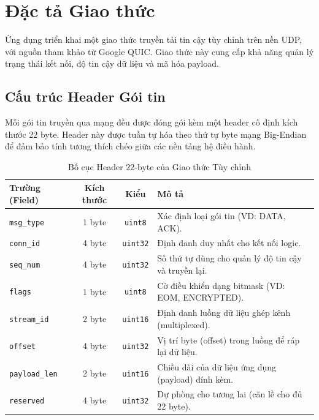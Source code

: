 \section{Đặc tả Giao thức}

Ứng dụng triển khai một giao thức truyền tải tin cậy tùy chỉnh trên nền UDP, với nguồn tham khảo từ Google QUIC. Giao thức này cung cấp khả năng quản lý trạng thái kết nối, độ tin cậy dữ liệu và mã hóa payload.

\subsection{Cấu trúc Header Gói tin}
Mỗi gói tin truyền qua mạng đều được đóng gói kèm một header cố định kích thước 22 byte. Header này được tuần tự hóa theo thứ tự byte mạng Big-Endian để đảm bảo tính tương thích chéo giữa các nền tảng hệ điều hành.

\begin{table}[htbp]
\centering
\renewcommand{\arraystretch}{1.3}
\begin{tabular}{|l|c|c|p{}|}
\hline
\textbf{Trường (Field)} & \textbf{Kích thước} & \textbf{Kiểu} & \textbf{Mô tả} \\ \hline
\texttt{msg\_type} & 1 byte & \texttt{uint8} & Xác định loại gói tin (VD: DATA, ACK). \\ \hline
\texttt{conn\_id} & 4 byte & \texttt{uint32} & Định danh duy nhất cho kết nối logic. \\ \hline
\texttt{seq\_num} & 4 byte & \texttt{uint32} & Số thứ tự dùng cho quản lý độ tin cậy và truyền lại. \\ \hline
\texttt{flags} & 1 byte & \texttt{uint8} & Cờ điều khiển dạng bitmask (VD: EOM, ENCRYPTED). \\ \hline
\texttt{stream\_id} & 2 byte & \texttt{uint16} & Định danh luồng dữ liệu ghép kênh (multiplexed). \\ \hline
\texttt{offset} & 4 byte & \texttt{uint32} & Vị trí byte (offset) trong luồng để ráp lại dữ liệu. \\ \hline
\texttt{payload\_len} & 2 byte & \texttt{uint16} & Chiều dài của dữ liệu ứng dụng (payload) đính kèm. \\ \hline
\texttt{reserved} & 4 byte & \texttt{uint32} & Dự phòng cho tương lai (căn lề cho đủ 22 byte). \\ \hline
\end{tabular}
\caption{Bố cục Header 22-byte của Giao thức Tùy chỉnh}
\label{tab:header_layout}
\end{table}


